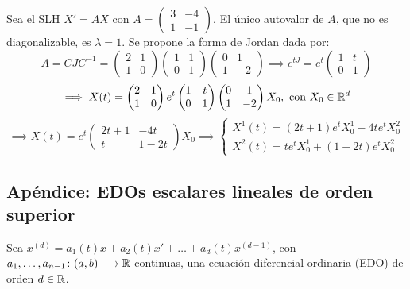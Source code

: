 \begin{ejem}
	Sea el SLH $X' = A X$ con $A = \begin{pmatrix}
			3 & -4 \\
			1 & -1
		\end{pmatrix}$. El único autovalor de $A$, que no es diagonalizable, es $\lambda = 1$. Se propone la forma de Jordan dada por:
	\[A = CJC^{-1} = \begin{pmatrix}
			2 & 1 \\
			1 & 0
		\end{pmatrix} \begin{pmatrix}
			1 & 1 \\
			0 & 1
		\end{pmatrix} \begin{pmatrix}
			0 & 1  \\
			1 & -2
		\end{pmatrix} \implies e^{t J} = e^{t}\begin{pmatrix}
			1 & t \\
			0 & 1
		\end{pmatrix}\]
	\[\implies X(t) = \begin{pmatrix}
			2 & 1 \\
			1 & 0
		\end{pmatrix} e^t \begin{pmatrix}
			1 & t \\
			0 & 1
		\end{pmatrix} \begin{pmatrix}
			0 & 1  \\
			1 & -2
		\end{pmatrix} X_0, \text{ con } X_0 \in \mathbb{R}^d\]
	\[\implies X(t) = e^t \begin{pmatrix}
			2t +1 & -4t  \\
			t     & 1-2t
		\end{pmatrix} X_0 \implies \begin{cases}
			X^1(t) = (2t+1)e^t X_0^1 - 4te^t X_0^2 \\
			X^2(t) = te^t X_0^1 + (1-2t)e^t X_0^2
		\end{cases}\]
\end{ejem}

\subsection{Apéndice: EDOs escalares lineales de orden superior}

Sea $x^{(d)} = a_1(t) x + a_2(t) x' + \dots + a_d(t) x^{(d-1)}$, con $a_1, \dots, a_{n-1} \colon (a,b) \longrightarrow \mathbb{R}$ continuas, una ecuación diferencial ordinaria (EDO) de orden $d \in \mathbb{R}$.

